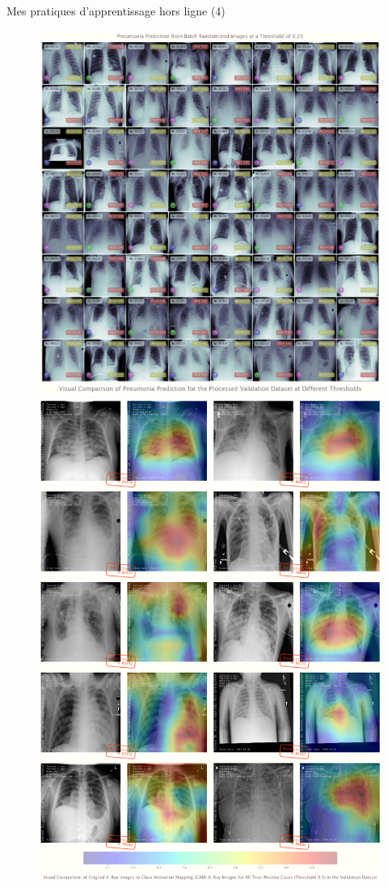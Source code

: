 \documentclass{beamer}
\begin{document}
\begin{frame}[fragile]{Mes pratiques d'apprentissage hors ligne (4)}
\begin{figure}[!htb]
			\centering\includegraphics[width=\linewidth]{images/deep_learning_5_1_2.png}
			\endminipage\hfill
			\centering\includegraphics[width=\linewidth]{images/deep_learning_5_2.png}

\end{figure}
\end{frame}
\end{document}
